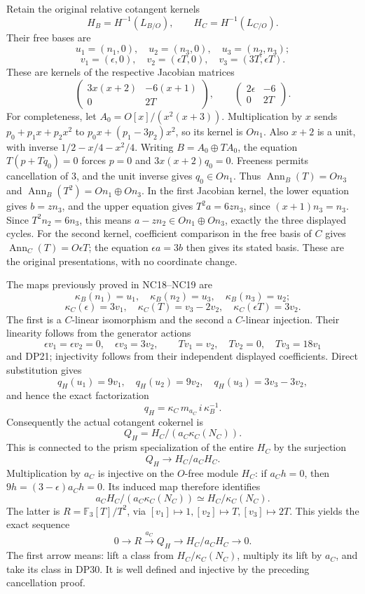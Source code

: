 \documentclass[
  10pt,
  a4paper,
]{article}
\begin{document}
Retain the original relative cotangent kernels \[
H_B=H^{-1}(L_{B/O}),\qquad H_C=H^{-1}(L_{C/O}).
\] Their free bases are \[
u_1=(n_1,0),\quad u_2=(n_3,0),\quad u_3=(n_2,n_3);
\] \[
v_1=(\epsilon,0),\quad v_2=(\epsilon T,0),\quad
v_3=(3T,\epsilon T).
\tag{DP27}
\] These are kernels of the respective Jacobian matrices \[
\begin{pmatrix}3x(x+2)&-6(x+1)\\0&2T\end{pmatrix},
\qquad
\begin{pmatrix}2\epsilon&-6\\0&2T\end{pmatrix}.
\] For completeness, let \(A_0=O[x]/(x^2(x+3))\). Multiplication by
\(x\) sends \(p_0+p_1x+p_2x^2\) to \(p_0x+(p_1-3p_2)x^2\), so its kernel
is \(On_1\). Also \(x+2\) is a unit, with inverse \(1/2-x/4-x^2/4\).
Writing \(B=A_0\oplus TA_0\), the equation \(T(p+Tq_0)=0\) forces
\(p=0\) and \(3x(x+2)q_0=0\). Freeness permits cancellation of 3, and
the unit inverse gives \(q_0\in On_1\). Thus
\(\operatorname{Ann}_B(T)=On_3\) and
\(\operatorname{Ann}_B(T^2)=On_1\oplus On_3\). In the first Jacobian
kernel, the lower equation gives \(b=zn_3\), and the upper equation
gives \(T^2a=6zn_3\), since \((x+1)n_3=n_3\). Since \(T^2n_2=6n_3\),
this means \(a-zn_2\in On_1\oplus On_3\), exactly the three displayed
cycles. For the second kernel, coefficient comparison in the free basis
of \(C\) gives \(\operatorname{Ann}_C(T)=O\epsilon T\); the equation
\(\epsilon a=3b\) then gives its stated basis. These are the original
presentations, with no coordinate change.

The maps previously proved in NC18--NC19 are \[
\kappa_B(n_1)=u_1,\quad\kappa_B(n_2)=u_3,\quad
\kappa_B(n_3)=u_2;
\] \[
\kappa_C(\epsilon)=3v_1,\quad
\kappa_C(T)=v_3-2v_2,\quad
\kappa_C(\epsilon T)=3v_2.
\tag{DP28}
\] The first is a \(C\)-linear isomorphism and the second a \(C\)-linear
injection. Their linearity follows from the generator actions \[
\epsilon v_1=\epsilon v_2=0,\quad\epsilon v_3=3v_2,\qquad
Tv_1=v_2,\quad Tv_2=0,\quad Tv_3=18v_1
\] and DP21; injectivity follows from their independent displayed
coefficients. Direct substitution gives \[
q_H(u_1)=9v_1,\quad q_H(u_2)=9v_2,\quad
q_H(u_3)=3v_3-3v_2,
\] and hence the exact factorization \[
\boxed{q_H=\kappa_C\,m_{a_C}\,i\,\kappa_B^{-1}.}
\tag{DP29}
\] Consequently the actual cotangent cokernel is \[
Q_H=H_C/(a_C\kappa_C(N_C)).
\tag{DP30}
\] This is connected to the prism specialization of the entire \(H_C\)
by the surjection \[
Q_H\longrightarrow H_C/a_CH_C.
\] Multiplication by \(a_C\) is injective on the \(O\)-free module
\(H_C\): if \(a_C h=0\), then \(9h=(3-\epsilon)a_C h=0\). Its induced
map therefore identifies \[
a_CH_C/(a_C\kappa_C(N_C))
\simeq H_C/\kappa_C(N_C).
\] The latter is \(R=\mathbb F_3[T]/T^2\), via
\([v_1]\mapsto1,[v_2]\mapsto T,[v_3]\mapsto2T\). This yields the exact
sequence \[
0\longrightarrow R\xrightarrow{\,a_C\,}Q_H
\longrightarrow H_C/a_CH_C\longrightarrow0.
\tag{DP31}
\] The first arrow means: lift a class from \(H_C/\kappa_C(N_C)\),
multiply its lift by \(a_C\), and take its class in DP30. It is well
defined and injective by the preceding cancellation proof.
\end{document}
